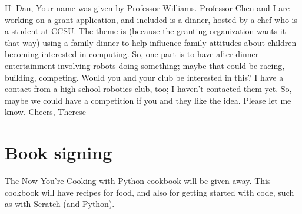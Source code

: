 \documentclass[]{article}
\begin{document}
Hi Dan,
Your name was given by Professor Williams.
Professor Chen and I are working on a grant application, and included is a dinner, hosted by a chef who is a student at CCSU. The theme is (because the granting organization wants it that way) using a family dinner to help influence family attitudes about children becoming interested in computing. So, one part is to have after-dinner entertainment involving robots doing something; maybe that could be racing, building, competing. Would you and your club be interested in this? 
I have a contact from a high school robotics club, too; I haven't contacted them yet. So, maybe we could have a competition if you and they like the idea. Please let me know.
Cheers,
Therese

\section{Book signing}
The Now You're Cooking with Python cookbook will be given away. This cookbook will have recipes for food, and also for getting started with code, such as with Scratch (and Python).
\end{document}
